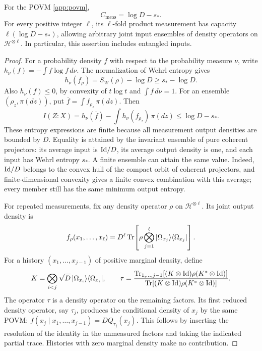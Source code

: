 \begin{proposition}
\label{app:capacity}
For the POVM \eqref{app:povm},
\begin{equation}
 C_{\mathrm{meas}}=\log D-s_*.
 \label{app:measurement-capacity}
\end{equation}
For every positive integer $\ell$, its $\ell$-fold product measurement
has capacity $\ell(\log D-s_*)$, allowing arbitrary joint input
ensembles of density operators on $\mathcal H^{\otimes\ell}$.
In particular, this assertion includes entangled inputs.
\end{proposition}
\begin{proof}
For a probability density $f$ with respect to the probability measure
$\nu$, write $h_\nu(f)=-\int f\log f\,d\nu$.
The normalization of Wehrl entropy gives
\begin{equation}
 h_\nu(f_\rho)=S_W(\rho)-\log D\ge s_*-\log D.
 \label{app:output-entropy}
\end{equation}
Also $h_\nu(f)\le0$, by convexity of $t\log t$ and $\int f\,d\nu=1$.
For an ensemble $(\rho_z,\pi(dz))$, put
$\overline f=\int f_{\rho_z}\,\pi(dz)$.  Then
\[
 I(Z:X)
 =h_\nu(\overline f)-\int h_\nu(f_{\rho_z})\,\pi(dz)
 \le\log D-s_*.
\]
These entropy expressions are finite because all measurement output
densities are bounded by $D$.  Equality is attained by the invariant
ensemble of pure coherent projectors: its average input is $\mathrm{Id}/D$,
its average output density is one, and each input has Wehrl entropy
$s_*$.  A finite ensemble can attain the same value.  Indeed,
$\mathrm{Id}/D$ belongs to the convex hull of the compact orbit of coherent
projectors, and finite-dimensional convexity gives a finite convex
combination with this average; every member still has the same
minimum output entropy.

For repeated measurements, fix any density operator $\rho$ on
$\mathcal H^{\otimes\ell}$.  Its joint output density is
\[
 f_\rho(x_1,\ldots,x_\ell)
 =D^\ell\operatorname{Tr}\!\left[\rho\bigotimes_{j=1}^\ell
                |\Omega_{x_j}\rangle\langle\Omega_{x_j}|\right].
\]
For a history $(x_1,\ldots,x_{j-1})$ of positive marginal density,
define
\[
 K=\bigotimes_{i<j}\sqrt D\,
       |\Omega_{x_i}\rangle\langle\Omega_{x_i}|,
 \qquad
 \tau=
 \frac{\operatorname{Tr}_{1,\ldots,j-1}[(K\otimes\mathrm{Id})\rho(K^*\otimes\mathrm{Id})]}
      {\operatorname{Tr}[(K\otimes\mathrm{Id})\rho(K^*\otimes\mathrm{Id})]}.
\]
The operator $\tau$ is a density operator on the remaining factors.
Its first reduced density operator, say $\tau_j$, produces the
conditional density of $x_j$ by the same POVM:
$f(x_j\mid x_1,\ldots,x_{j-1})=D Q_{\tau_j}(x_j)$.
This follows by inserting the resolution of the identity in the
unmeasured factors and taking the indicated partial trace.
Histories with zero marginal density make no contribution.


\end{proof}
